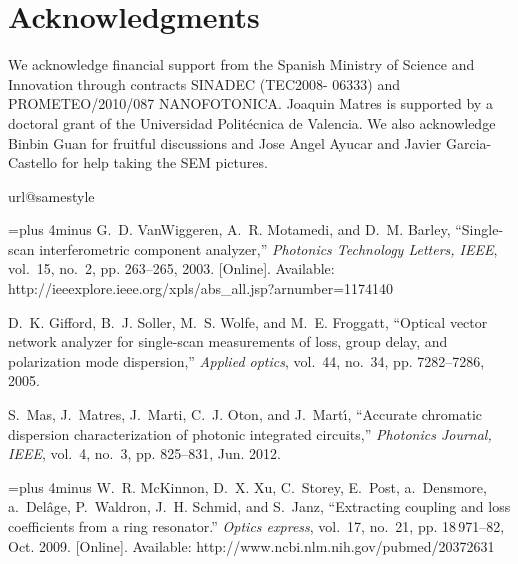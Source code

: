 \documentclass[journal]{IEEEtran}
\begin{document}
\section*{Acknowledgments}
We acknowledge financial support from the Spanish Ministry of Science and Innovation through contracts SINADEC (TEC2008- 06333) and PROMETEO/2010/087 NANOFOTONICA. Joaquin Matres is supported by a doctoral grant of the Universidad Polit\'ecnica de Valencia. We also acknowledge Binbin Guan for fruitful discussions and Jose Angel Ayucar and Javier Garcia-Castello for help taking the SEM pictures.

\begin{thebibliography}{10}
\providecommand{\url}[1]{#1}
\csname url@samestyle\endcsname
\providecommand{\newblock}{\relax}
\providecommand{\bibinfo}[2]{#2}
\providecommand{\BIBentrySTDinterwordspacing}{\spaceskip=0pt\relax}
\providecommand{\BIBentryALTinterwordstretchfactor}{4}
\providecommand{\BIBentryALTinterwordspacing}{\spaceskip=\fontdimen2\font plus
\BIBentryALTinterwordstretchfactor\fontdimen3\font minus
  \fontdimen4\font\relax}
\providecommand{\BIBforeignlanguage}[2]{{%
\expandafter\ifx\csname l@#1\endcsname\relax
\typeout{** WARNING: IEEEtran.bst: No hyphenation pattern has been}%
\typeout{** loaded for the language `#1'. Using the pattern for}%
\typeout{** the default language instead.}%
\else
\language=\csname l@#1\endcsname
\fi
#2}}
\providecommand{\BIBdecl}{\relax}
\BIBdecl

\BIBentryALTinterwordspacing
G.~D. VanWiggeren, A.~R. Motamedi, and D.~M. Barley, ``{Single-scan
  interferometric component analyzer},'' \emph{Photonics Technology Letters,
  IEEE}, vol.~15, no.~2, pp. 263--265, 2003. [Online]. Available:
  \url{http://ieeexplore.ieee.org/xpls/abs\_all.jsp?arnumber=1174140}
\BIBentrySTDinterwordspacing

D.~K. Gifford, B.~J. Soller, M.~S. Wolfe, and M.~E. Froggatt, ``{Optical vector
  network analyzer for single-scan measurements of loss, group delay, and
  polarization mode dispersion},'' \emph{Applied optics}, vol.~44, no.~34, pp.
  7282--7286, 2005.

S.~Mas, J.~Matres, J.~Marti, C.~J. Oton, and J.~Mart\'{\i}, ``{Accurate
  chromatic dispersion characterization of photonic integrated circuits},''
  \emph{Photonics Journal, IEEE}, vol.~4, no.~3, pp. 825--831, Jun. 2012.

\BIBentryALTinterwordspacing
W.~R. McKinnon, D.~X. Xu, C.~Storey, E.~Post, a.~Densmore, a.~Del\^{a}ge,
  P.~Waldron, J.~H. Schmid, and S.~Janz, ``{Extracting coupling and loss
  coefficients from a ring resonator.}'' \emph{Optics express}, vol.~17,
  no.~21, pp. 18\,971--82, Oct. 2009. [Online]. Available:
  \url{http://www.ncbi.nlm.nih.gov/pubmed/20372631}
\BIBentrySTDinterwordspacing


\end{thebibliography}
\end{document}
